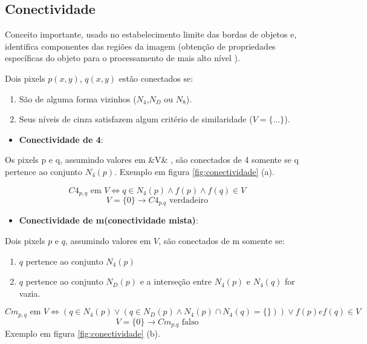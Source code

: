 \documentclass[
  brazilian,
]{book}
\providecommand{\tightlist}{%
  \setlength{\itemsep}{0pt}\setlength{\parskip}{0pt}}
\begin{document}
\hypertarget{conectividade}{%
\subsection{Conectividade}\label{conectividade}}

Conceito importante, usado no estabelecimento limite das bordas de objetos e, identifica componentes das regiões da imagem (obtenção de propriedades específicas do objeto para o processamento de mais alto nível ).

Dois pixels \(p(x,y)\), \(q(x,y)\) estão conectados se:

\begin{enumerate}
\def\labelenumi{\arabic{enumi}.}
\tightlist
\item
  São de alguma forma vizinhos (\(N_4\),\(N_D\) ou \(N_8\)).
\item
  Seus níveis de cinza satisfazem algum critério de similaridade (\(V = \{ \dots \}\)).
\end{enumerate}

\begin{itemize}
\tightlist
\item
  \textbf{Conectividade de 4}:
\end{itemize}

Os pixels p e q, assumindo valores em \&V\& , são conectados de 4 somente se q pertence ao conjunto \(N_4(p)\). Exemplo em figura \ref{fig:conectividade} (a).

\[C4_{p,q} \text{ em } V \Leftrightarrow q \in N_4(p) \wedge f(p) \wedge f(q) \in V \]
\[V = \{0\} \to C4_{p.q} \text{ verdadeiro}\]

\begin{itemize}
\tightlist
\item
  \textbf{Conectividade de m(conectividade mista)}:
\end{itemize}

Dois pixels \(p\) e \(q\), assumindo valores em \(V\), são conectados de m somente se:

\begin{enumerate}
\def\labelenumi{\arabic{enumi}.}
\tightlist
\item
  \(q\) pertence ao conjunto \(N_4(p)\)
\item
  \(q\) pertence ao conjunto \(N_D(p)\) e a interseção entre \(N_4(p)\) e \(N_4(q)\) for vazia.
\end{enumerate}

\[Cm_{p,q} \text{ em } V\Leftrightarrow (q \in N_4(p) \vee (q \in N_D(p) \wedge N_4(p) \cap N_4(q) = \{\})) \vee f(p) e f(q) \in V  \]
\[V = \{0\} \to Cm_{p.q}\text{ falso}\]
Exemplo em figura \ref{fig:conectividade} (b).
\end{document}
